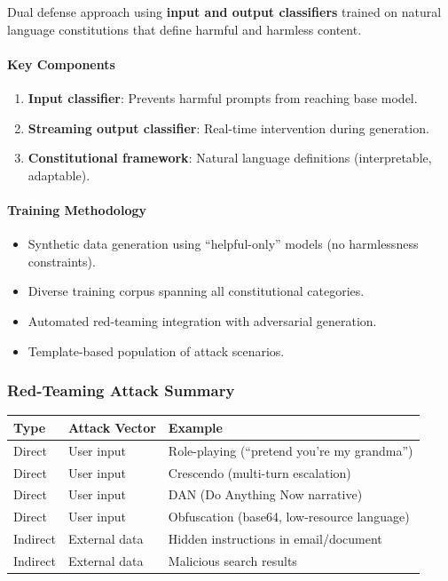 \begin{defbox}
Dual defense approach using \textbf{input and output classifiers} trained on natural language constitutions that define harmful and harmless content.
\end{defbox}

\paragraph*{Key Components}
\begin{enumerate}
  \item \textbf{Input classifier}: Prevents harmful prompts from reaching base model.
  \item \textbf{Streaming output classifier}: Real-time intervention during generation.
  \item \textbf{Constitutional framework}: Natural language definitions (interpretable, adaptable).
\end{enumerate}

\paragraph*{Training Methodology}
\begin{itemize}
  \item Synthetic data generation using ``helpful-only'' models (no harmlessness constraints).
  \item Diverse training corpus spanning all constitutional categories.
  \item Automated red-teaming integration with adversarial generation.
  \item Template-based population of attack scenarios.
\end{itemize}

\subsubsection*{Red-Teaming Attack Summary}

\begin{center}
\renewcommand{\arraystretch}{1.3}
\begin{tabular}{@{} l l p{5cm} @{}}
\toprule
\textbf{Type} & \textbf{Attack Vector} & \textbf{Example} \\
\midrule
Direct & User input & Role-playing (``pretend you're my grandma'') \\
Direct & User input & Crescendo (multi-turn escalation) \\
Direct & User input & DAN (Do Anything Now narrative) \\
Direct & User input & Obfuscation (base64, low-resource language) \\
Indirect & External data & Hidden instructions in email/document \\
Indirect & External data & Malicious search results \\
\bottomrule
\end{tabular}
\end{center}

